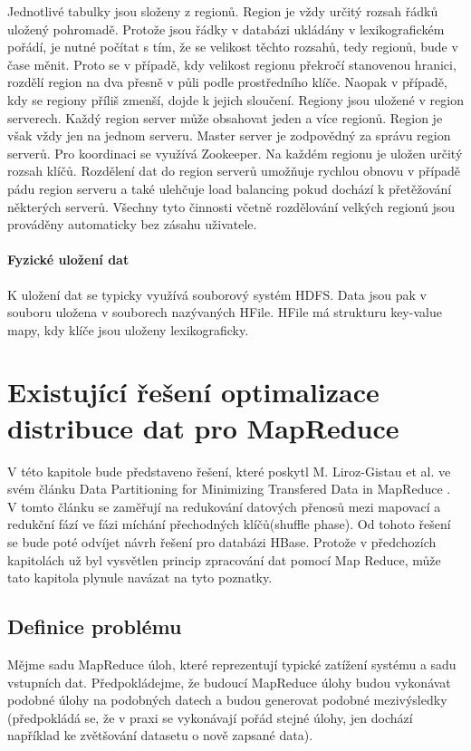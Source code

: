 \documentclass[thesis=M,czech]{FITthesis}[2012/06/26]
\begin{document}
Jednotlivé tabulky jsou složeny z regionů. Region je vždy určitý rozsah řádků uložený pohromadě. Protože jsou řádky v databázi ukládány v lexikografickém pořádí, je nutné počítat s tím, že se velikost těchto rozsahů, tedy regionů, bude v čase měnit. Proto se v případě, kdy velikost regionu překročí stanovenou hranici, rozdělí region na dva přesně v půli podle prostředního klíče. Naopak v případě, kdy se regiony příliš zmenší, dojde k jejich sloučení. Regiony jsou uložené v region serverech. Každý region server může obsahovat jeden a více regionů. Region je však vždy jen na jednom serveru. Master server je zodpovědný za správu region serverů. Pro koordinaci se využívá Zookeeper. Na každém regionu je uložen určitý rozsah klíčů. Rozdělení dat do region serverů umožňuje rychlou obnovu v případě pádu region serveru a také ulehčuje load balancing pokud dochází k přetěžování některých serverů. Všechny tyto činnosti včetně rozdělování velkých regionú jsou prováděny automaticky bez zásahu uživatele.


\subsubsection{Fyzické uložení dat}	
K uložení dat se typicky využívá souborový systém HDFS. Data jsou pak v souboru uložena v souborech nazývaných HFile. HFile má strukturu key-value mapy, kdy klíče jsou uloženy lexikograficky. 




\chapter{Existující řešení optimalizace distribuce dat pro MapReduce}
V této kapitole bude představeno řešení, které poskytl M. Liroz-Gistau et al. ve svém článku Data Partitioning for Minimizing Transfered Data in MapReduce \cite{gistau}. V tomto článku se zaměřují na redukování datových přenosů mezi mapovací a redukční fází ve fázi míchání přechodných klíčů(shuffle phase).  Od tohoto řešení se bude poté odvíjet návrh řešení pro databázi HBase. Protože v předchozích kapitolách už byl vysvětlen princip zpracování dat pomocí Map Reduce, může tato kapitola plynule navázat na tyto poznatky. 

\section{Definice problému}
Mějme sadu MapReduce úloh, které reprezentují typické zatížení systému a sadu vstupních dat. Předpokládejme, že budoucí MapReduce úlohy budou vykonávat podobné úlohy na podobných datech a budou generovat podobné mezivýsledky (předpokládá se, že v praxi se vykonávají pořád stejné úlohy, jen dochází například ke zvětšování datasetu o nově zapsané data). 
\end{document}
